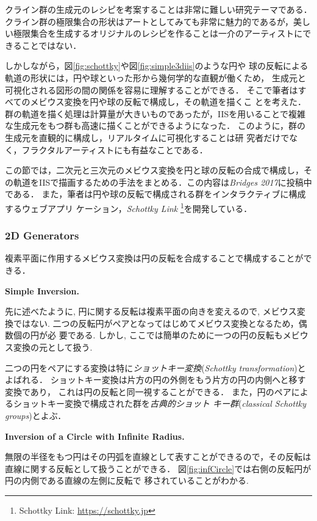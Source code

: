 クライン群の生成元のレシピを考案することは非常に難しい研究テーマである．
クライン群の極限集合の形状はアートとしてみても非常に魅力的であるが，美し
い極限集合を生成するオリジナルのレシピを作ることは一介のアーティストにで
きることではない．

しかしながら，図\ref{fig:schottky}や図\ref{fig:simple3diis}のような円や
球の反転による軌道の形状には，円や球といった形から幾何学的な直観が働くため，
生成元と可視化される図形の間の関係を容易に理解することができる．
そこで筆者はすべてのメビウス変換を円や球の反転で構成し，その軌道を描くこ
とを考えた．
群の軌道を描く処理は計算量が大きいものであったが，IISを用いることで複雑
な生成元をもつ群も高速に描くことができるようになった．
このように，群の生成元を直観的に構成し，リアルタイムに可視化することは研
究者だけでなく，フラクタルアーティストにも有益なことである．

この節では，二次元と三次元のメビウス変換を円と球の反転の合成で構成し，そ
の軌道をIISで描画するための手法をまとめる．この内容は\textit{Bridges
2017}に投稿中である．
また，筆者は円や球の反転で構成される群をインタラクティブに構成するウェブアプリ
ケーション，{\it Schottky Link} \footnote{Schottky Link:
\url{https://schottky.jp}}を開発している．

\subsubsection{2D Generators}

複素平面に作用するメビウス変換は円の反転を合成することで構成することがで
きる．

\noindent\textbf{Simple Inversion.}

先に述べたように, 円に関する反転は複素平面の向きを変えるので, メビウス変
換ではない.
二つの反転円がペアとなってはじめてメビウス変換となるため，偶数個の円が必
要である.
しかし, ここでは簡単のために一つの円の反転もメビウス変換の元として扱う.

二つの円をペアにする変換は特に\emph{ショットキー変換}(\textit{Schottky
transformation})とよばれる．
ショットキー変換は片方の円の外側をもう片方の円の内側へと移す変換であり，
これは円の反転と同一視することができる．
また，円のペアによるショットキー変換で構成された群を\emph{古典的ショット
キー群}(\textit{classical Schottky groups})とよぶ．

\noindent\textbf{Inversion of a Circle with Infinite Radius.}

無限の半径をもつ円はその円弧を直線として表すことができるので，その反転は
直線に関する反転として扱うことができる．
図\ref{fig:infCircle}では右側の反転円が円の内側である直線の左側に反転で
移されていることがわかる.

